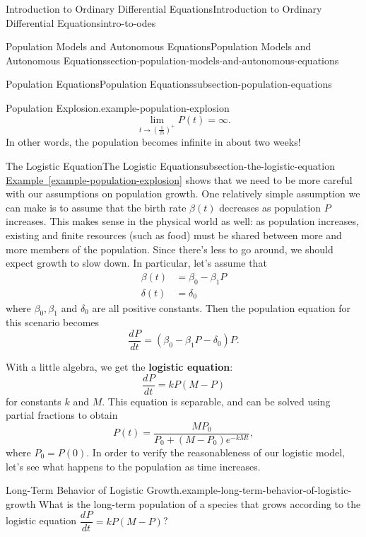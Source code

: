 \documentclass[oneside,10pt,]{book}
\newcommand{\terminology}[1]{\textbf{#1}}
\numberwithin{equation}{section}
\newcommand{\dv}[3][]{\dfrac{d^{#1} #2}{d #3^{#1}}}
\begin{document}
\begin{chapterptx}{Introduction to Ordinary Differential Equations}{}{Introduction to Ordinary Differential Equations}{}{}{intro-to-odes}
\begin{sectionptx}{Population Models and Autonomous Equations}{}{Population Models and Autonomous Equations}{}{}{section-population-models-and-autonomous-equations}
\begin{subsectionptx}{Population Equations}{}{Population Equations}{}{}{subsection-population-equations}
\begin{example}{Population Explosion.}{example-population-explosion}
\begin{equation*}
\lim_{t\to(\frac{1}{25})^{+}}P(t) = \infty.
\end{equation*}
In other words, the population becomes infinite in about two weeks!%
\end{example}
\end{subsectionptx}
%
%
\typeout{************************************************}
\typeout{************************************************}
%
\begin{subsectionptx}{The Logistic Equation}{}{The Logistic Equation}{}{}{subsection-the-logistic-equation}
\hypertarget{p-111}{}%
\hyperref[example-population-explosion]{Example~\ref{example-population-explosion}} shows that we need to be more careful with our assumptions on population growth. One relatively simple assumption we can make is to assume that the birth rate \(\beta(t)\) decreases as population \(P\) increases. This makes sense in the physical world as well: as population increases, existing and finite resources (such as food) must be shared between more and more members of the population. Since there's less to go around, we should expect growth to slow down. In particular, let's assume that%
\begin{align*}
\beta(t) & = \beta_{0} - \beta_{1}P \\
\delta(t) & = \delta_{0} 
\end{align*}
where \(\beta_{0},\beta_{1}\) and \(\delta_{0}\) are all positive constants. Then the population equation for this scenario becomes%
\begin{equation*}
\dv{P}{t} = (\beta_{0} - \beta_{1}P - \delta_{0})P.
\end{equation*}
%
\par
\hypertarget{p-112}{}%
With a little algebra, we get the \terminology{logistic equation}:%
\begin{equation*}
\dv{P}{t} = kP(M-P)
\end{equation*}
for constants \(k\) and \(M\). This equation is separable, and can be solved using partial fractions to obtain%
\begin{equation*}
P(t) = \frac{MP_{0}}{P_{0} + (M - P_{0})e^{-kMt}},
\end{equation*}
where \(P_{0} = P(0)\). In order to verify the reasonableness of our logistic model, let's see what happens to the population as time increases.%
\begin{example}{Long-Term Behavior of Logistic Growth.}{example-long-term-behavior-of-logistic-growth}%
\hypertarget{p-113}{}%
What is the long-term population of a species that grows according to the logistic equation \(\dv{P}{t} = kP(M-P)\)?%

\end{example}
\end{subsectionptx}
\end{sectionptx}
\end{chapterptx}
\end{document}
